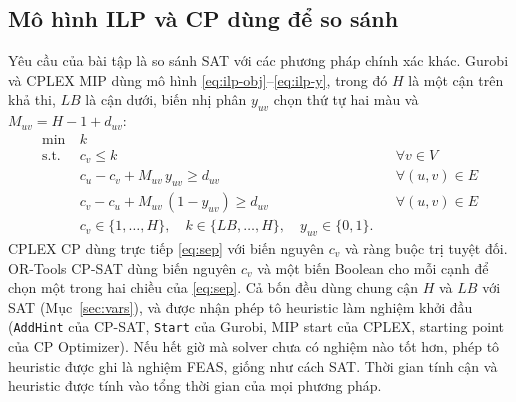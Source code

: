 \subsection{Mô hình ILP và CP dùng để so sánh}\label{sec:ilp}

Yêu cầu của bài tập là so sánh SAT với các phương pháp chính xác khác. Gurobi và CPLEX MIP dùng mô hình \eqref{eq:ilp-obj}--\eqref{eq:ilp-y}, trong đó $H$ là một cận trên khả thi, $LB$ là cận dưới, biến nhị phân $y_{uv}$ chọn thứ tự hai màu và $M_{uv}=H-1+d_{uv}$:
\begin{align}
\min\ & k \label{eq:ilp-obj}\\
\text{s.t.}\ & c_v\le k && \forall v\in V \label{eq:ilp-k}\\
& c_u-c_v+M_{uv}\,y_{uv}\ge d_{uv} && \forall (u,v)\in E \label{eq:ilp-a}\\
& c_v-c_u+M_{uv}\,(1-y_{uv})\ge d_{uv} && \forall (u,v)\in E \label{eq:ilp-b}\\
& c_v\in\{1,\dots,H\},\quad k\in\{LB,\dots,H\},\quad y_{uv}\in\{0,1\}. \label{eq:ilp-y}
\end{align}
CPLEX CP dùng trực tiếp \eqref{eq:sep} với biến nguyên $c_v$ và ràng buộc trị tuyệt đối. OR-Tools CP-SAT dùng biến nguyên $c_v$ và một biến Boolean cho mỗi cạnh để chọn một trong hai chiều của \eqref{eq:sep}. Cả bốn đều dùng chung cận $H$ và $LB$ với SAT (Mục~\ref{sec:vars}), và được nhận phép tô heuristic làm nghiệm khởi đầu (\texttt{AddHint} của CP-SAT, \texttt{Start} của Gurobi, MIP start của CPLEX, starting point của CP Optimizer). Nếu hết giờ mà solver chưa có nghiệm nào tốt hơn, phép tô heuristic được ghi là nghiệm FEAS, giống như cách SAT. Thời gian tính cận và heuristic được tính vào tổng thời gian của mọi phương pháp.
